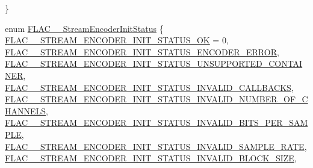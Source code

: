 \begin{DoxyCompactItemize}
 \}
\item 
enum \hyperlink{group__flac__stream__encoder_ga3bb869620af2b188d77982a5c30b047d}{F\+L\+A\+C\+\_\+\+\_\+\+Stream\+Encoder\+Init\+Status} \{ \newline
\hyperlink{group__flac__stream__encoder_gga3bb869620af2b188d77982a5c30b047da20501dce552da74c5df935eeaa0c9ee3}{F\+L\+A\+C\+\_\+\+\_\+\+S\+T\+R\+E\+A\+M\+\_\+\+E\+N\+C\+O\+D\+E\+R\+\_\+\+I\+N\+I\+T\+\_\+\+S\+T\+A\+T\+U\+S\+\_\+\+OK} = 0, 
\hyperlink{group__flac__stream__encoder_gga3bb869620af2b188d77982a5c30b047da9c64e5f9020d8799e1cd9d39d50e6955}{F\+L\+A\+C\+\_\+\+\_\+\+S\+T\+R\+E\+A\+M\+\_\+\+E\+N\+C\+O\+D\+E\+R\+\_\+\+I\+N\+I\+T\+\_\+\+S\+T\+A\+T\+U\+S\+\_\+\+E\+N\+C\+O\+D\+E\+R\+\_\+\+E\+R\+R\+OR}, 
\hyperlink{group__flac__stream__encoder_gga3bb869620af2b188d77982a5c30b047da8a822b011de88b67c114505ffef39327}{F\+L\+A\+C\+\_\+\+\_\+\+S\+T\+R\+E\+A\+M\+\_\+\+E\+N\+C\+O\+D\+E\+R\+\_\+\+I\+N\+I\+T\+\_\+\+S\+T\+A\+T\+U\+S\+\_\+\+U\+N\+S\+U\+P\+P\+O\+R\+T\+E\+D\+\_\+\+C\+O\+N\+T\+A\+I\+N\+ER}, 
\hyperlink{group__flac__stream__encoder_gga3bb869620af2b188d77982a5c30b047dac2cf461f02e20513003b8cadeae03f9f}{F\+L\+A\+C\+\_\+\+\_\+\+S\+T\+R\+E\+A\+M\+\_\+\+E\+N\+C\+O\+D\+E\+R\+\_\+\+I\+N\+I\+T\+\_\+\+S\+T\+A\+T\+U\+S\+\_\+\+I\+N\+V\+A\+L\+I\+D\+\_\+\+C\+A\+L\+L\+B\+A\+C\+KS}, 
\newline
\hyperlink{group__flac__stream__encoder_gga3bb869620af2b188d77982a5c30b047da0541c4f827f081b9f1c54c9441e4aa65}{F\+L\+A\+C\+\_\+\+\_\+\+S\+T\+R\+E\+A\+M\+\_\+\+E\+N\+C\+O\+D\+E\+R\+\_\+\+I\+N\+I\+T\+\_\+\+S\+T\+A\+T\+U\+S\+\_\+\+I\+N\+V\+A\+L\+I\+D\+\_\+\+N\+U\+M\+B\+E\+R\+\_\+\+O\+F\+\_\+\+C\+H\+A\+N\+N\+E\+LS}, 
\hyperlink{group__flac__stream__encoder_gga3bb869620af2b188d77982a5c30b047dad6d2631f464183c0c165155200882e6b}{F\+L\+A\+C\+\_\+\+\_\+\+S\+T\+R\+E\+A\+M\+\_\+\+E\+N\+C\+O\+D\+E\+R\+\_\+\+I\+N\+I\+T\+\_\+\+S\+T\+A\+T\+U\+S\+\_\+\+I\+N\+V\+A\+L\+I\+D\+\_\+\+B\+I\+T\+S\+\_\+\+P\+E\+R\+\_\+\+S\+A\+M\+P\+LE}, 
\hyperlink{group__flac__stream__encoder_gga3bb869620af2b188d77982a5c30b047da6fdcde9e18c37450c79e8f12b9d9c134}{F\+L\+A\+C\+\_\+\+\_\+\+S\+T\+R\+E\+A\+M\+\_\+\+E\+N\+C\+O\+D\+E\+R\+\_\+\+I\+N\+I\+T\+\_\+\+S\+T\+A\+T\+U\+S\+\_\+\+I\+N\+V\+A\+L\+I\+D\+\_\+\+S\+A\+M\+P\+L\+E\+\_\+\+R\+A\+TE}, 
\hyperlink{group__flac__stream__encoder_gga3bb869620af2b188d77982a5c30b047da652c445f1bd8b6cfb963a30bf416c95a}{F\+L\+A\+C\+\_\+\+\_\+\+S\+T\+R\+E\+A\+M\+\_\+\+E\+N\+C\+O\+D\+E\+R\+\_\+\+I\+N\+I\+T\+\_\+\+S\+T\+A\+T\+U\+S\+\_\+\+I\+N\+V\+A\+L\+I\+D\+\_\+\+B\+L\+O\+C\+K\+\_\+\+S\+I\+ZE}, 
\newline

\end{DoxyCompactItemize}
